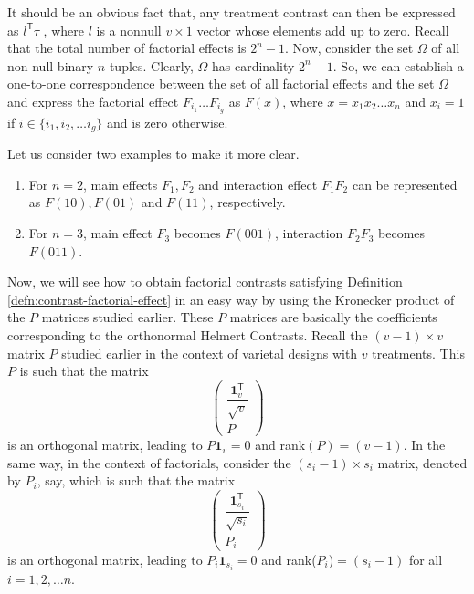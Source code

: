 \documentclass[12pt]{article}
\newcommand{\transpose}{\mathsf{T}}
\theoremstyle{definition}
\newenvironment{example}[1][\unskip]{
\begin{tcolorbox}[colback=blue!5!white,colframe=blue!75!black, title = {Example #1}, parbox = false] }{\end{tcolorbox} }
\begin{document}
It should be an obvious fact that, any treatment contrast can then be expressed as $l^{\transpose}\tau$ , where $l$ is a nonnull $v \times 1$ vector whose elements add up to zero. Recall that the total  number of factorial effects  is $2^n-1$. Now, consider the set  $\Omega$ of all non-null binary $n$-tuples. Clearly, $\Omega$  has cardinality $2^n-1$. So, we can establish a one-to-one correspondence between the set of all
factorial effects and the set $\Omega$ and express the factorial effect $F_{i_1} \ldots F_{i_g} $ as $F(x)$, where $x = x_1 x_2\ldots x_n$ and  $x_i=1$ if $i \in \{i_1, i_2, \ldots i_g\}$ and is zero otherwise. 

Let us consider two examples to make it more clear.

\begin{example}
    \begin{enumerate}
        \item For $n=2$, main effects $F_1, F_2$ and interaction effect $F_1F_2$  can be represented as $F(10), F(01)$ and $F(11)$, respectively.
        \item For $n=3$, main effect $F_3$ becomes $F(001)$, interaction $F_2F_3$ becomes $F(011)$.
    \end{enumerate}
\end{example}

Now, we will see how to  obtain factorial contrasts satisfying Definition \ref{defn:contrast-factorial-effect} in an easy way by  using the Kronecker product of the $P$ matrices studied earlier. These $P$ matrices are basically the coefficients corresponding to the orthonormal Helmert Contrasts. Recall the $(v-1)\times v$ matrix $P$ studied earlier in the context of varietal designs with $v$ treatments. This $P$  is such that the matrix 
$$\begin{pmatrix}
\dfrac{\mathbf{1}_v^{\transpose}}{\sqrt{v}}\\
P
\end{pmatrix}$$ 
is an orthogonal matrix, leading to $P\mathbf{1}_v=0$ and rank$(P) =(v-1)$. In the same way, in the context of factorials, consider the  $(s_i-1)\times s_i$ matrix, denoted by $P_i$, say,  which is such that the matrix 
$$\begin{pmatrix}
\dfrac{\mathbf{1}_{s_i}^{\transpose}}{\sqrt{s_i}}\\
P_i
\end{pmatrix}$$ 
is an orthogonal matrix, leading to $P_i \mathbf{1}_{s_i}=0$ and rank($P_i$)$=(s_i - 1)$ for all $i = 1, 2, \dots n$.
\end{document}
